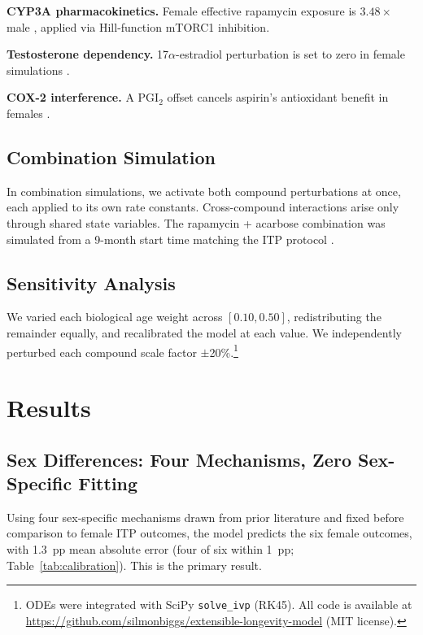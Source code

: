 \documentclass[11pt]{article}
\begin{document}
\textbf{CYP3A pharmacokinetics.} Female effective rapamycin exposure is $3.48\times$ male \citep{Lamming2014}, applied via Hill-function mTORC1 inhibition.

\textbf{Testosterone dependency.} 17$\alpha$-estradiol perturbation is set to zero in female simulations \citep{Garratt2018}.

\textbf{COX-2 interference.} A PGI$_2$ offset cancels aspirin's antioxidant benefit in females \citep{Egan2004,Grosser2006}.

\subsection{Combination Simulation}

In combination simulations, we activate both compound perturbations at once, each applied to its own rate constants. Cross-compound interactions arise only through shared state variables. The rapamycin + acarbose combination was simulated from a 9-month start time matching the ITP protocol \citep{Strong2022}.

\subsection{Sensitivity Analysis}

We varied each biological age weight across $[0.10, 0.50]$, redistributing the remainder equally, and recalibrated the model at each value. We independently perturbed each compound scale factor $\pm$20\%.\footnote{ODEs were integrated with SciPy \texttt{solve\_ivp} (RK45). All code is available at \url{https://github.com/silmonbiggs/extensible-longevity-model} (MIT license).}

\section{Results}

\subsection{Sex Differences: Four Mechanisms, Zero Sex-Specific Fitting}

Using four sex-specific mechanisms drawn from prior literature and fixed before comparison to female ITP outcomes, the model predicts the six female outcomes, with 1.3~pp mean absolute error (four of six within 1~pp; Table~\ref{tab:calibration}). This is the primary result.
\end{document}
